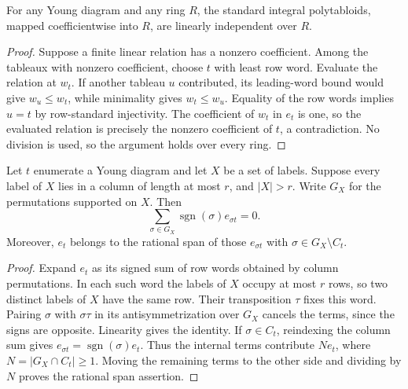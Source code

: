 \begin{theorem}
\label{lem:standard-polytabloid-independent}
\leanok
For any Young diagram and any ring $R$, the standard integral
polytabloids, mapped coefficientwise into $R$, are linearly independent
over $R$.
\end{theorem}
\begin{proof}
Suppose a finite linear relation has a nonzero coefficient. Among
the tableaux with nonzero coefficient, choose $t$ with least row word.
Evaluate the relation at $w_t$. If another tableau $u$ contributed,
its leading-word bound would give $w_u\leq w_t$, while minimality
gives $w_t\leq w_u$. Equality of the row words implies $u=t$ by
row-standard injectivity. The coefficient of $w_t$ in $e_t$ is one,
so the evaluated relation is precisely the nonzero coefficient of
$t$, a contradiction. No division is used, so the argument holds
over every ring.
\end{proof}

\begin{lemma}
\label{lem:garnir-cancellation}
\leanok
Let $t$ enumerate a Young diagram and let $X$ be a set of labels.
Suppose every label of $X$ lies in a column of length at most $r$,
and $|X|>r$. Write $G_X$ for the permutations supported on $X$.
Then
\[
 \sum_{\sigma\in G_X}\operatorname{sgn}(\sigma)e_{\sigma t}=0.
\]
Moreover, $e_t$ belongs to the rational span of those
$e_{\sigma t}$ with $\sigma\in G_X\setminus C_t$.
\end{lemma}
\begin{proof}
Expand $e_t$ as its signed sum of row words obtained by column
permutations. In each such word the labels of $X$ occupy at most
$r$ rows, so two distinct labels of $X$ have the same row.
Their transposition $\tau$ fixes this word. Pairing $\sigma$ with
$\sigma\tau$ in its antisymmetrization over $G_X$ cancels the
terms, since the signs are opposite. Linearity gives the identity.
If $\sigma\in C_t$, reindexing the column sum gives
$e_{\sigma t}=\operatorname{sgn}(\sigma)e_t$. Thus the internal
terms contribute $Ne_t$, where $N=|G_X\cap C_t|\geq1$.
Moving the remaining terms to the other side and dividing by
$N$ proves the rational span assertion.
\end{proof}

